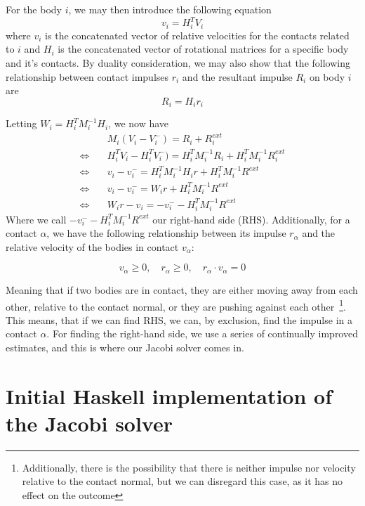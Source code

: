 \documentclass[runningheads,a4paper]{llncs}
\begin{document}
For the body $i$, we may then introduce the following equation
\begin{equation}
  v_i = H_i^TV_i
\end{equation}
where $v_i$ is the concatenated vector of relative velocities for the contacts
related to $i$ and $H_i$ is the concatenated vector of rotational matrices for a
specific body and it's contacts. By duality consideration, we may also show that
the following relationship between contact impulses $r_i$ and the resultant
impulse $R_i$ on body $i$ are
\begin{equation}
R_i = H_i r_i
\end{equation}

Letting $W_i = H_i^TM_i^{-1}H_i$, we now have
\begin{align}
  & M_i(V_i - V_i^-) = R_i + R_i^{ext} \\
  \Leftrightarrow \quad & H_i^T V_i - H_i^T V_i^-) = H_i^TM_i^{-1} R_i + H_i^T
  M_i^{-1} R_i^{ext}
  \\
  \Leftrightarrow \quad & v_i - v_i^{-} = H_i^T M_i^{-1}H_i r + H_i^T M_i^{-1} R^{ext} \\
  \Leftrightarrow \quad & v_i - v_i^{-} = W_i r + H_i^T M_i^{-1} R^{ext} \\
  \Leftrightarrow \quad & W_i r - v_i = -v_i^{-} - H_i^T M_i^{-1} R^{ext}
\end{align}
Where we call $-v_i^{-} - H_i^T M_i^{-1} R^{ext}$ our right-hand side (RHS).
Additionally, for a contact $\alpha$, we have the following relationship between
its impulse $r_\alpha$ and the relative velocity of the bodies in contact
$v_\alpha$:

\begin{equation}
  v_\alpha \geq 0, \quad r_\alpha \geq 0, \quad r_\alpha \cdot v_\alpha = 0
\end{equation}

Meaning that if two bodies are in contact, they are either moving away from
each other, relative to the contact normal, or they are pushing against each
other~\footnote{Additionally, there is the possibility that there is neither
  impulse nor velocity relative to the contact normal, but we can disregard
  this case, as it has no effect on the outcome}. This means, that if we can
find RHS, we can, by exclusion, find the impulse in a contact $\alpha$. For
finding the right-hand side, we use a series of continually improved estimates,
and this is where our Jacobi solver comes in.

\section{Initial Haskell implementation of the Jacobi solver}
\end{document}
